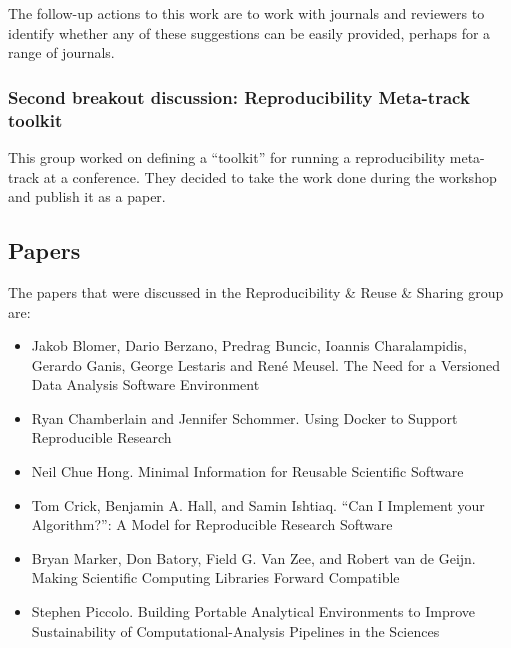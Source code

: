 \documentclass[11pt, oneside]{amsart}
\begin{document}
The follow-up actions to this work are to work with journals and reviewers to
identify whether any of these suggestions can be easily provided, perhaps for a
range of journals.

\subsubsection{Second breakout discussion: Reproducibility Meta-track toolkit}

This group worked on defining a ``toolkit'' for running a reproducibility
meta-track at a conference. They decided to take the work done during the
workshop and publish it as a paper.



\subsection{Papers}
The papers that were discussed in the Reproducibility \& Reuse \& Sharing group are:
\begin{itemize}
\item Jakob Blomer, Dario Berzano, Predrag Buncic, Ioannis Charalampidis,
Gerardo Ganis, George Lestaris and Ren\'{e} Meusel. The Need for a Versioned
Data Analysis Software Environment~\cite{wssspe2_blomer}

\item Ryan Chamberlain and Jennifer Schommer. Using {Docker} to Support
Reproducible Research~\cite{wssspe2_chamberlain}

\item Neil Chue Hong. Minimal Information for Reusable Scientific
Software~\cite{wssspe2_chue_hong}

\item Tom Crick, Benjamin A. Hall, and Samin Ishtiaq. ``Can I Implement your
Algorithm?'': A Model for Reproducible Research Software~\cite{wssspe2_crick}

\item Bryan Marker, Don Batory, Field G. Van Zee, and Robert van de Geijn. Making
Scientific Computing Libraries Forward Compatible~\cite{wssspe2_marker}

\item Stephen Piccolo. Building Portable Analytical Environments to Improve
Sustainability of Computational-Analysis Pipelines in the
Sciences~\cite{wssspe2_piccolo}
\end{itemize}
\end{document}
